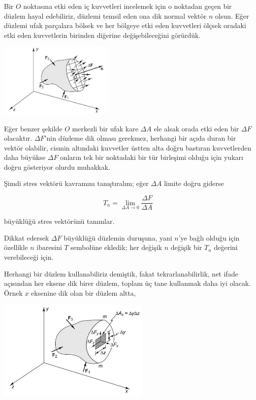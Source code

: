 \documentclass[12pt,fleqn]{article}\usepackage{../../common}
\begin{document}
Bir $O$ noktasına etki eden iç kuvvetleri incelemek için o noktadan geçen bir
düzlem hayal edebiliriz, düzlemi temsil eden ona dik normal vektör $n$ olsun.
Eğer düzlemi ufak parçalara bölsek ve her bölgeye etki eden kuvvetleri ölçsek
oradaki etki eden kuvvetlerin birinden diğerine değişebileceğini görürdük.

\includegraphics[width=15em]{phy_020_strs_02_17.jpg}

Eğer benzer şekilde $O$ merkezli bir ufak kare $\Delta A$ ele alsak orada etki
eden bir $\Delta F$ olacaktır. $\Delta F$'nin düzleme dik olması gerekmez,
herhangi bir açıda duran bir vektör olabilir, cismin altındaki kuvvetler üstten
alta doğru bastıran kuvvetlerden daha büyükse $\Delta F$ onların tek bir
noktadaki bir tür birleşimi olduğu için yukarı doğru gösteriyor olurdu muhakkak.

Şimdi stres vektörü kavramını tanıştıralım; eğer $\Delta A$ limite doğru giderse

$$
T_n = \lim_{\Delta A \to 0} \frac{\Delta F}{\Delta A}
$$

büyüklüğü stres vektörünü tanımlar.

Dikkat edersek $\Delta F$ büyüklüğü düzlemin duruşuna, yani $n$'ye bağlı olduğu
için özellikle $n$ ibaresini $T$ sembolüne ekledik; her değişik $n$ değişik bir
$T_n$ değerini verebileceği için.

Herhangi bir düzlem kullanabiliriz demiştik, fakat tekrarlanabilirlik, net ifade
açısından her eksene dik birer düzlem, toplam üç tane kullanmak daha iyi
olacak. Örnek $x$ eksenine dik olan bir düzlem altta,

\includegraphics[width=20em]{phy_020_strs_02_18.jpg}
\end{document}
